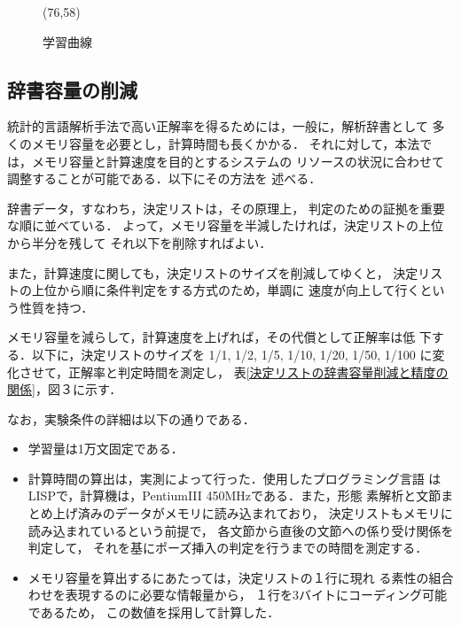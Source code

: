 \begin{figure}[t]
  \begin{center}
	\atari(76,58)
    \vspace{-3mm}
    \caption{学習曲線}
    \vspace{-5mm}
  \end{center}
\end{figure}

\subsection{辞書容量の削減}

   統計的言語解析手法で高い正解率を得るためには，一般に，解析辞書として
   多くのメモリ容量を必要とし，計算時間も長くかかる．
   それに対して，本法では，メモリ容量と計算速度を目的とするシステムの
   リソースの状況に合わせて調整することが可能である．以下にその方法を
   述べる．
   
       辞書データ，すなわち，決定リストは，その原理上，
       判定のための証拠を重要な順に並べている．
       よって，メモリ容量を半減したければ，決定リストの上位から半分を残して
       それ以下を削除すればよい．

       また，計算速度に関しても，決定リストのサイズを削減してゆくと，
       決定リストの上位から順に条件判定をする方式のため，単調に
       速度が向上して行くという性質を持つ．

   メモリ容量を減らして，計算速度を上げれば，その代償として正解率は低
   下する．以下に，決定リストのサイズを 1/1, 1/2, 1/5, 1/10, 1/20, 1/50,
   1/100 に変化させて，正解率と判定時間を測定し，
   表\ref{決定リストの辞書容量削減と精度の関係}，図３に示す．

   なお，実験条件の詳細は以下の通りである．
   \begin{itemize}
	\item 学習量は1万文固定である．

	\item 計算時間の算出は，実測によって行った．使用したプログラミング言語
	      はLISPで，計算機は，PentiumIII 450MHzである．また，形態
	      素解析と文節まとめ上げ済みのデータがメモリに読み込まれており，
	      決定リストもメモリに読み込まれているという前提で，
	      各文節から直後の文節への係り受け関係を判定して，
	      それを基にポーズ挿入の判定を行うまでの時間を測定する．

        \item メモリ容量を算出するにあたっては，決定リストの１行に現れ
	      る素性の組合わせを表現するのに必要な情報量から，
	      １行を3バイトにコーディング可能であるため，
	      この数値を採用して計算した．
   \end{itemize}

